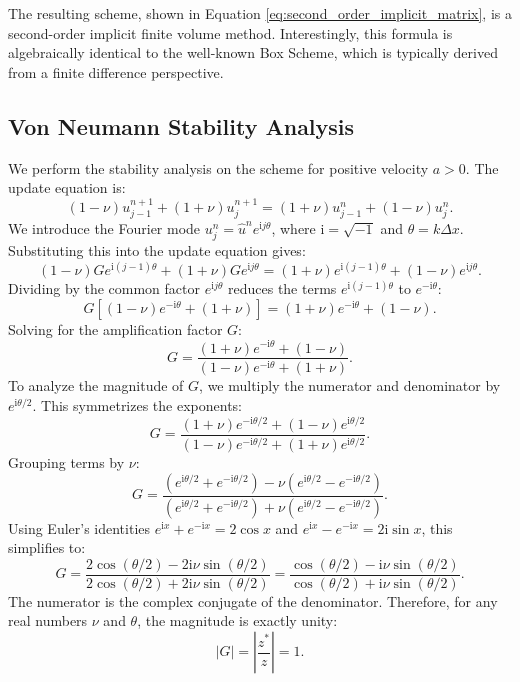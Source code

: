 The resulting scheme, shown in Equation \eqref{eq:second_order_implicit_matrix}, is a second-order implicit finite volume method.
Interestingly, this formula is algebraically identical to the well-known Box Scheme, which is typically derived from a finite difference perspective.

\subsection{Von Neumann Stability Analysis}
We perform the stability analysis on the scheme for positive velocity \( a > 0 \). The update equation is:
\begin{equation}
    (1-\nu) u_{j-1}^{n+1} + (1+\nu) u_{j}^{n+1} = (1+\nu) u_{j-1}^{n} + (1-\nu) u_{j}^{n}.
\end{equation}
We introduce the Fourier mode \( u_j^n = \hat{u}^n e^{\mathrm{i} j \theta} \), where \( \mathrm{i} = \sqrt{-1} \) and \( \theta = k \Delta x \).
Substituting this into the update equation gives:
\[
    (1-\nu) G e^{\mathrm{i} (j-1) \theta} + (1+\nu) G e^{\mathrm{i} j \theta} = (1+\nu) e^{\mathrm{i} (j-1) \theta} + (1-\nu) e^{\mathrm{i} j \theta}.
\]
Dividing by the common factor \( e^{\mathrm{i} j \theta} \) reduces the terms \( e^{\mathrm{i} (j-1) \theta} \) to \( e^{-\mathrm{i} \theta} \):
\[
    G \left[ (1-\nu) e^{-\mathrm{i} \theta} + (1+\nu) \right] = (1+\nu) e^{-\mathrm{i} \theta} + (1-\nu).
\]
Solving for the amplification factor \( G \):
\[
    G = \frac{(1+\nu) e^{-\mathrm{i} \theta} + (1-\nu)}{(1-\nu) e^{-\mathrm{i} \theta} + (1+\nu)}.
\]
To analyze the magnitude of \( G \), we multiply the numerator and denominator by \( e^{\mathrm{i} \theta/2} \). This symmetrizes the exponents:
\[
    G = \frac{(1+\nu) e^{-\mathrm{i} \theta/2} + (1-\nu) e^{\mathrm{i} \theta/2}}{(1-\nu) e^{-\mathrm{i} \theta/2} + (1+\nu) e^{\mathrm{i} \theta/2}}.
\]
Grouping terms by \(\nu\):
\[
    G = \frac{ (e^{\mathrm{i} \theta/2} + e^{-\mathrm{i} \theta/2}) - \nu(e^{\mathrm{i} \theta/2} - e^{-\mathrm{i} \theta/2}) }{ (e^{\mathrm{i} \theta/2} + e^{-\mathrm{i} \theta/2}) + \nu(e^{\mathrm{i} \theta/2} - e^{-\mathrm{i} \theta/2}) }.
\]
Using Euler's identities \( e^{\mathrm{i} x} + e^{-\mathrm{i} x} = 2\cos x \) and \( e^{\mathrm{i} x} - e^{-\mathrm{i} x} = 2\mathrm{i}\sin x \), this simplifies to:
\begin{equation}
    G = \frac{ 2\cos(\theta/2) - 2\mathrm{i}\nu\sin(\theta/2) }{ 2\cos(\theta/2) + 2\mathrm{i}\nu\sin(\theta/2) } 
      = \frac{ \cos(\theta/2) - \mathrm{i}\nu\sin(\theta/2) }{ \cos(\theta/2) + \mathrm{i}\nu\sin(\theta/2) }.
\end{equation}
The numerator is the complex conjugate of the denominator. 
Therefore, for any real numbers \(\nu\) and \(\theta\), the magnitude is exactly unity:
\begin{equation}
    |G| = \left| \frac{z^*}{z} \right| = 1.
\end{equation}

